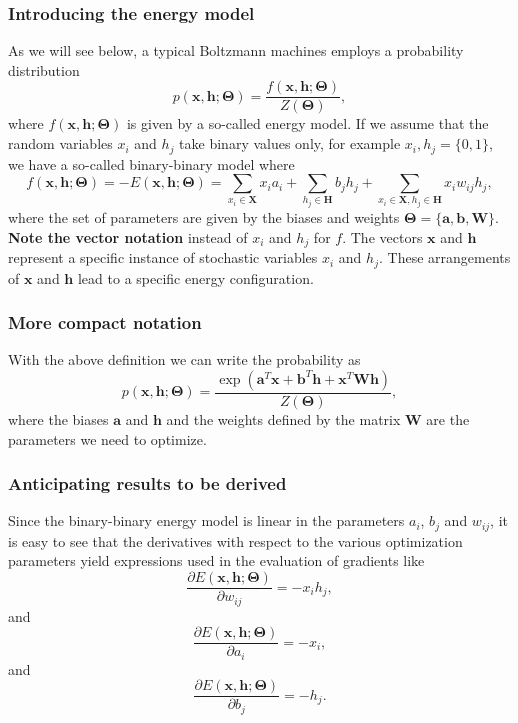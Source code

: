 \documentclass{beamer}
\begin{document}
\begin{frame}
\frametitle{Introducing the energy model}

As we will see below, a typical Boltzmann machines employs a probability distribution
\[
p(\bm{x},\bm{h};\bm{\Theta}) = \frac{f(\bm{x},\bm{h};\bm{\Theta})}{Z(\bm{\Theta})},
\]
where $f(\bm{x},\bm{h};\bm{\Theta})$ is given by a so-called energy model. If we assume that the random variables $x_i$ and $h_j$ take binary values only, for example $x_i,h_j=\{0,1\}$, we have a so-called binary-binary model where
\[
f(\bm{x},\bm{h};\bm{\Theta})=-E(\bm{x}, \bm{h};\bm{\Theta}) = \sum_{x_i\in \bm{X}} x_i a_i+\sum_{h_j\in \bm{H}} b_j h_j + \sum_{x_i\in \bm{X},h_j\in\bm{H}} x_i w_{ij} h_j,
\]
where the set of parameters are given by the biases and weights $\bm{\Theta}=\{\bm{a},\bm{b},\bm{W}\}$.
\textbf{Note the vector notation} instead of $x_i$ and $h_j$ for $f$. The vectors $\bm{x}$ and $\bm{h}$ represent a specific instance of stochastic variables $x_i$ and $h_j$. These arrangements of $\bm{x}$ and $\bm{h}$ lead to a specific energy configuration.
\end{frame}

\begin{frame}
\frametitle{More compact notation}

With the above definition we can write the probability as
\[
p(\bm{x},\bm{h};\bm{\Theta}) = \frac{\exp{(\bm{a}^T\bm{x}+\bm{b}^T\bm{h}+\bm{x}^T\bm{W}\bm{h})}}{Z(\bm{\Theta})},
\]
where the biases $\bm{a}$ and $\bm{h}$ and the weights defined by the matrix $\bm{W}$ are the parameters we need to optimize.
\end{frame}

\begin{frame}
\frametitle{Anticipating results to be derived}

Since the binary-binary energy model is linear in the parameters $a_i$, $b_j$ and
$w_{ij}$, it is easy to see that the derivatives with respect to the
various optimization parameters yield expressions used in the
evaluation of gradients like
\[
\frac{\partial E(\bm{x}, \bm{h};\bm{\Theta})}{\partial w_{ij}}=-x_ih_j,
\]
and
\[
\frac{\partial E(\bm{x}, \bm{h};\bm{\Theta})}{\partial a_i}=-x_i,
\]
and
\[
\frac{\partial E(\bm{x}, \bm{h};\bm{\Theta})}{\partial b_j}=-h_j.
\]
\end{frame}
\end{document}
